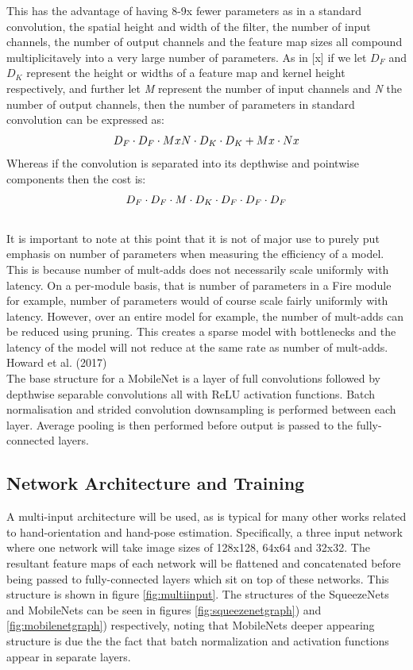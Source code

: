 \documentclass{article}
\begin{document}
This has the advantage of having 8-9x fewer parameters as in a standard convolution, the spatial height and width of the filter, the number of input channels, the number of output channels and the feature map sizes all compound multiplicitavely into a very large number of parameters. As in [x] if we let \emph{$D_{F}$} and \emph{$D_{K}$} represent the height or widths of a feature map and kernel height respectively, and further let \emph{M} represent the number of input channels and \emph{N} the number of output channels, then the number of parameters in standard convolution can be expressed as: \[\emph{$D_{F}$} \cdot \emph{$D_{F}$} \cdot M x N \cdot \emph{$D_{K}$} \cdot \emph{$D_{K}$} + M x \cdot N x \] Whereas if the convolution is separated into its depthwise and pointwise components then the cost is: \[\emph{$D_{F}$} \cdot \emph{$D_{F}$} \cdot M \cdot \emph{$D_{K}$} \cdot \emph{$D_{F}$} \cdot \emph{$D_{F}$} \cdot \emph{$D_{F}$}\]\\

It is important to note at this point that it is not of major use to purely put emphasis on number of parameters when measuring the efficiency of a model. This is because number of mult-adds does not necessarily scale uniformly with latency. On a per-module basis, that is number of parameters in a Fire module for example, number of parameters would of course scale fairly uniformly with latency. However, over an entire model for example, the number of mult-adds can be reduced using pruning. This creates a sparse model with bottlenecks and the latency of the model will not reduce at the same rate as number of mult-adds. Howard et al. (2017) \\

The base structure for a MobileNet is a layer of full convolutions followed by depthwise separable convolutions all with ReLU activation functions. Batch normalisation and strided convolution downsampling is performed between each layer. Average pooling is then performed before output is passed to the fully-connected layers.\\


\subsection{Network Architecture and Training}
A multi-input architecture will be used, as is typical for many other works related to hand-orientation and hand-pose estimation. Specifically, a three input network where one network will take image sizes of 128x128, 64x64 and 32x32. The resultant feature maps of each network will be flattened and concatenated before being passed to fully-connected layers which sit on top of these networks. This structure is shown in figure \ref{fig:multiinput}. The structures of the SqueezeNets and MobileNets can be seen in figures \ref{fig:squeezenetgraph}) and \ref{fig:mobilenetgraph}) respectively, noting that MobileNets deeper appearing structure is due the the fact that batch normalization and activation functions appear in separate layers.\\
\end{document}
